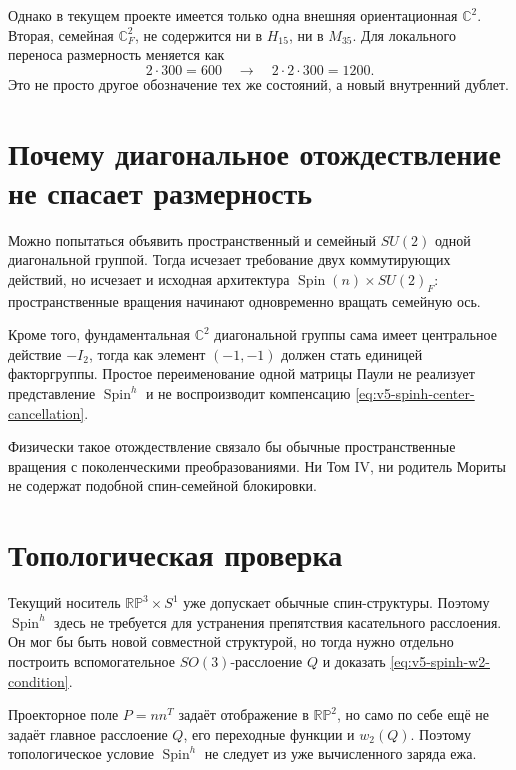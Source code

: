 Однако в текущем проекте имеется только одна внешняя ориентационная
$\mathbb C^2$. Вторая, семейная $\mathbb C^2_F$, не содержится ни в
$H_{15}$, ни в $M_{35}$. Для локального переноса размерность меняется как
\begin{equation}
 2\cdot300=600
 \quad\longrightarrow\quad
 2\cdot2\cdot300=1200.
 \label{eq:v5-spinh-dimension-budget}
\end{equation}
Это не просто другое обозначение тех же состояний, а новый внутренний
дублет.

\section{Почему диагональное отождествление не спасает размерность}

Можно попытаться объявить пространственный и семейный $SU(2)$ одной
диагональной группой. Тогда исчезает требование двух коммутирующих
действий, но исчезает и исходная архитектура
$\operatorname{Spin}(n)\times SU(2)_F$: пространственные вращения начинают
одновременно вращать семейную ось.

Кроме того, фундаментальная $\mathbb C^2$ диагональной группы сама имеет
центральное действие $-I_2$, тогда как элемент $(-1,-1)$ должен стать
единицей факторгруппы. Простое переименование одной матрицы Паули не
реализует представление $\operatorname{Spin}^h$ и не воспроизводит
компенсацию \eqref{eq:v5-spinh-center-cancellation}.

Физически такое отождествление связало бы обычные пространственные
вращения с поколенческими преобразованиями. Ни Том IV, ни родитель Мориты
не содержат подобной спин-семейной блокировки.

\section{Топологическая проверка}

Текущий носитель $\mathbb{RP}^3\times S^1$ уже допускает обычные
спин-структуры. Поэтому $\operatorname{Spin}^h$ здесь не требуется для
устранения препятствия касательного расслоения. Он мог бы быть новой
совместной структурой, но тогда нужно отдельно построить вспомогательное
$SO(3)$-расслоение $Q$ и доказать
\eqref{eq:v5-spinh-w2-condition}.

Проекторное поле $P=nn^T$ задаёт отображение в $\mathbb{RP}^2$, но само по
себе ещё не задаёт главное расслоение $Q$, его переходные функции и
$w_2(Q)$. Поэтому топологическое условие $\operatorname{Spin}^h$ не
следует из уже вычисленного заряда ежа.

